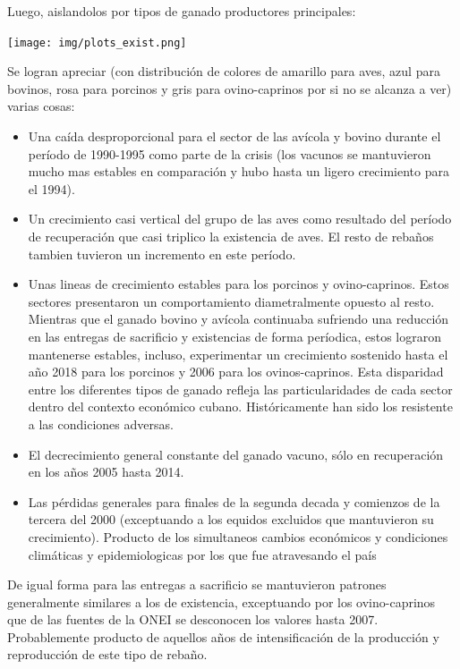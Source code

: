 \documentclass{article}
\begin{document}
Luego, aislandolos por tipos de ganado productores principales:
\begin{center}
    \texttt{[image: img/plots\_exist.png]}
\end{center}
Se logran apreciar (con distribución de colores de amarillo para aves, azul para bovinos, rosa para porcinos y gris para ovino-caprinos por si no se alcanza a ver) varias cosas:
\begin{itemize}
    \item Una caída desproporcional para el sector de las avícola y bovino durante el período de 1990-1995 como parte de la crisis (los vacunos se mantuvieron mucho mas estables en comparación y hubo hasta un ligero crecimiento para el 1994).
    \item Un crecimiento casi vertical del grupo de las aves como resultado del período de recuperación que casi triplico la existencia de aves. El resto de rebaños tambien tuvieron un incremento en este período.
    \item Unas lineas de crecimiento estables para los porcinos y ovino-caprinos. Estos sectores presentaron un comportamiento diametralmente opuesto al resto. Mientras que el ganado bovino y avícola continuaba sufriendo una reducción en las 
    entregas de sacrificio y existencias de forma períodica, estos lograron mantenerse estables, incluso, experimentar un crecimiento sostenido hasta el año 2018 para los porcinos y 2006 para los ovinos-caprinos. Esta disparidad entre los diferentes 
    tipos de ganado refleja las particularidades de cada sector dentro del contexto económico cubano. Históricamente han sido los resistente a las condiciones adversas. 
    \item El decrecimiento general constante del ganado vacuno, sólo en recuperación en los años 2005 hasta 2014.
    \item Las pérdidas generales para finales de la segunda decada y comienzos de la tercera del 2000 (exceptuando a los equidos excluidos que mantuvieron su crecimiento). Producto de los simultaneos cambios económicos y condiciones climáticas y epidemiologicas por los que fue atravesando el país 
\end{itemize}

De igual forma para las entregas a sacrificio se mantuvieron patrones generalmente similares a los de existencia, exceptuando por los ovino-caprinos que de las fuentes de la ONEI se desconocen los valores hasta 2007.
Probablemente producto de aquellos años de intensificación de la producción y reproducción de este tipo de rebaño.\\
\newpage
\end{document}

